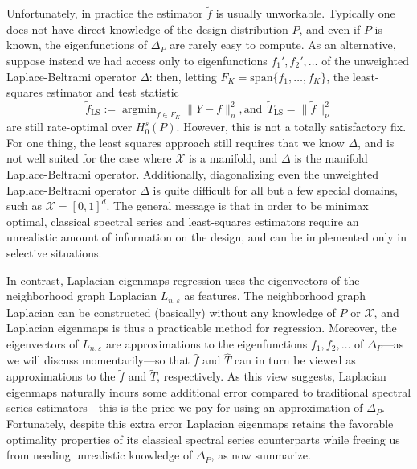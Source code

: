 \documentclass{article}
\newcommand{\1}{\mathbf{1}}
\DeclareMathOperator*{\argmin}{argmin}
\newcommand{\mc}[1]{\mathcal{#1}}
\newcommand{\wt}[1]{\widetilde{#1}}
\newcommand{\wh}[1]{\widehat{#1}}
\theoremstyle{alden}
\theoremstyle{aldenthm}
\theoremstyle{definition}
\theoremstyle{remark}
\begin{document}
Unfortunately, in practice the estimator $\wt{f}$ is usually unworkable. Typically one does not have direct knowledge of the design distribution $P$, and even if $P$ is known, the eigenfunctions of $\Delta_P$ are rarely easy to compute. As an alternative, suppose instead we had access only to eigenfunctions $f_1',f_2',\ldots$ of the unweighted Laplace-Beltrami operator $\Delta$: then, letting $F_K = \mathrm{span}\{f_1,\ldots,f_K\}$, the least-squares estimator and test statistic
\begin{equation*}
\wt{f}_{\mathrm{LS}} := \argmin_{f \in F_K} \|Y - f\|_n^2,\textrm{and}~~\wt{T}_{\mathrm{LS}} = \|\wt{f}\|_{\nu}^2
\end{equation*}
are still rate-optimal over $H_0^s(P)$. However, this is not a totally satisfactory fix. For one thing, the least squares approach still requires that we know $\Delta$, and is not well suited for the case where $\mc{X}$ is a manifold, and $\Delta$ is the manifold Laplace-Beltrami operator. Additionally, diagonalizing even the unweighted Laplace-Beltrami operator $\Delta$ is quite difficult for all but a few special domains, such as $\mc{X} = [0,1]^d$. The general message is that in order to be minimax optimal, classical spectral series and least-squares estimators require an unrealistic amount of information on the design, and can be implemented only in selective situations. 

In contrast, Laplacian eigenmaps regression uses the eigenvectors of the neighborhood graph Laplacian $L_{n,\varepsilon}$ as features. The neighborhood graph Laplacian can be constructed (basically) without any knowledge of $P$ or $\mc{X}$, and Laplacian eigenmaps is thus a practicable method for regression. Moreover, the eigenvectors of $L_{n,\varepsilon}$ are approximations to the eigenfunctions $f_1,f_2,\ldots$ of $\Delta_P$---as we will discuss momentarily---so that $\wh{f}$ and $\wh{T}$ can in turn be viewed as approximations to the $\wt{f}$ and $\wt{T}$, respectively. As this view suggests, Laplacian eigenmaps naturally incurs some additional error compared to traditional spectral series estimators---this is the price we pay for using an approximation of $\Delta_P$. Fortunately, despite this extra error Laplacian eigenmaps retains the favorable optimality properties of its classical spectral series counterparts while freeing us from needing unrealistic knowledge of $\Delta_P$, as now summarize. 
\end{document}
